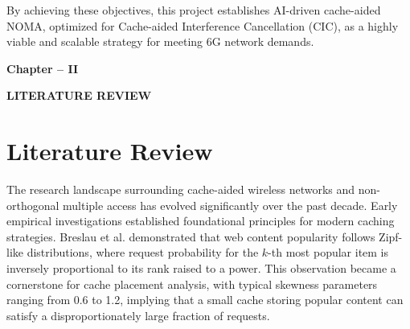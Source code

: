 \documentclass[12pt,a4paper]{article}
\begin{document}
By achieving these objectives, this project establishes AI-driven cache-aided NOMA, optimized for Cache-aided Interference Cancellation (CIC), as a highly viable and scalable strategy for meeting 6G network demands.

\thispagestyle{plain}


\clearpage

\begin{center}
    \vspace*{10cm}
    
    {\fontsize{16}{19.2}\selectfont\bfseries
    Chapter -- II}
    
    \vspace{1cm}
    
    {\fontsize{16}{19.2}\selectfont\bfseries
    LITERATURE REVIEW}
    
    \vspace*{\fill}
\end{center}

\thispagestyle{plain}


\clearpage

\section{Literature Review}

The research landscape surrounding cache-aided wireless networks and non-orthogonal multiple access has evolved significantly over the past decade. Early empirical investigations established foundational principles for modern caching strategies. Breslau et al. \cite{b_breslau_zipf} demonstrated that web content popularity follows Zipf-like distributions, where request probability for the $k$-th most popular item is inversely proportional to its rank raised to a power. This observation became a cornerstone for cache placement analysis, with typical skewness parameters ranging from 0.6 to 1.2, implying that a small cache storing popular content can satisfy a disproportionately large fraction of requests.
\end{document}
